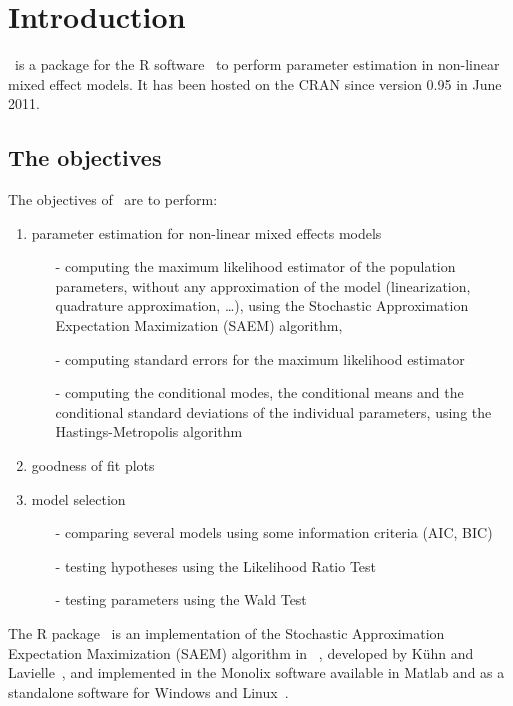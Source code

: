 \chapter{Introduction} \label{chapter_introduction}

\monolix~is a package for the {\sf R} software~\cite{R} to perform parameter estimation in non-linear mixed effect models. It has been hosted on the CRAN since version 0.95 in June 2011.

\section{The objectives}

The objectives of \monolix~are to perform:
\begin{enumerate}
\item parameter estimation for non-linear mixed effects models
\begin{itemize}
\item[-] computing the maximum likelihood estimator of the population parameters, without any approximation of the model (linearization, quadrature approximation, \ldots), using the Stochastic Approximation Expectation Maximization (SAEM) algorithm,
\item[-] computing standard errors for the maximum likelihood estimator
\item[-] computing the conditional modes, the conditional means and the conditional standard deviations of the individual parameters, using the Hastings-Metropolis algorithm
\end{itemize}
\item goodness of fit plots
\item model selection
\begin{itemize}
\item[-] comparing several models using some information criteria (AIC, BIC)
\item[-] testing hypotheses using the Likelihood Ratio Test
\item[-] testing parameters using the Wald Test
\end{itemize}
\end{enumerate}
The R package \monolix~is an implementation of the Stochastic Approximation Expectation Maximization (SAEM) algorithm in \R~\cite{R}, developed by K\"uhn and Lavielle~\cite{Kuhn05}, and implemented in the {\sc Monolix} software available in Matlab and as a standalone software for Windows and Linux~\cite{LavielleMonolix}.

